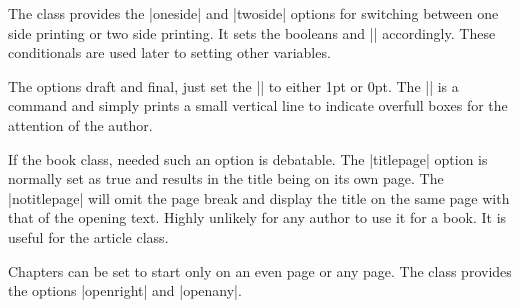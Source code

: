 \begin{teX}
\if@compatibility
  \renewcommand\@ptsize{0}
\else
\DeclareOption{10pt}{\renewcommand\@ptsize{0}}
\fi
\DeclareOption{11pt}{\renewcommand\@ptsize{1}}
\DeclareOption{12pt}{\renewcommand\@ptsize{2}}
\end{teX}


 The class provides the |oneside| and |twoside| options for switching between one side printing or two side printing.  It sets the booleans  and |\if@mparswitch| accordingly. These conditionals are used later to setting other variables.


\begin{teX}
\if@compatibility\else
\fi
{}
\end{teX}


 The options draft and final, just set the |\overfullrule| to either 1pt or 0pt. The |\overfullrule| is a \tex command and simply prints a small vertical line to indicate overfull boxes for the attention of the author. 


\begin{teX}
\if@compatibility\else
\fi
\end{teX}


 If the book class, needed such an option is debatable. The |titlepage| option is normally set as true and results in the title being on its own page. The |notitlepage| will omit the page break and display the title on the same page with that of the opening text. Highly unlikely for any author to use it for a book. It is useful for the article class.


\begin{teX}
\if@compatibility\else
\fi
\end{teX}


 Chapters can be set to start only on an even page or any page. The class provides the options |openright| and |openany|.


\begin{teX}
\if@compatibility
  \@openrighttrue
\else
\fi
\end{teX}



